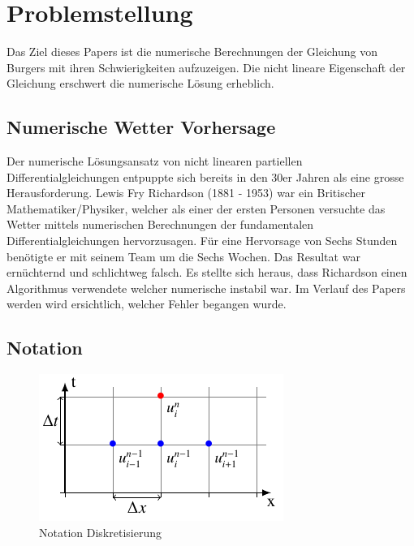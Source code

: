 %
%
\section{Problemstellung
\label{burgers:section:problemstellung}}

	Das Ziel dieses Papers ist die numerische Berechnungen der Gleichung von Burgers mit ihren Schwierigkeiten aufzuzeigen.
	Die nicht lineare Eigenschaft der Gleichung erschwert die numerische L\"osung erheblich.
	 
	
	\subsection{Numerische Wetter Vorhersage}
	\label{burgers:sec:nwp}
	
	Der numerische L\"osungsansatz von nicht linearen partiellen Differentialgleichungen entpuppte sich bereits in den 30er Jahren als eine grosse Herausforderung.
	Lewis Fry Richardson (1881 - 1953) war ein Britischer Mathematiker/Physiker, welcher als einer der ersten Personen versuchte das Wetter mittels numerischen Berechnungen der fundamentalen Differentialgleichungen hervorzusagen.
	F\"ur eine Hervorsage von Sechs Stunden ben\"otigte er mit seinem Team um die Sechs Wochen.
	Das Resultat war ern\"uchternd und schlichtweg falsch.
	Es stellte sich heraus, dass Richardson einen Algorithmus verwendete welcher numerische instabil war.
	Im Verlauf des Papers werden wird ersichtlich, welcher Fehler begangen wurde.
	
	\subsection{Notation}
	
     \begin{figure}
       \centering
       \includegraphics[height=.4\textwidth]{papers/burgers/BurgersEquation/tikz/Gitter/gitter.pdf}
       \caption{Notation Diskretisierung}
       \label{burgers:fig:Disk}
     \end{figure}
     

